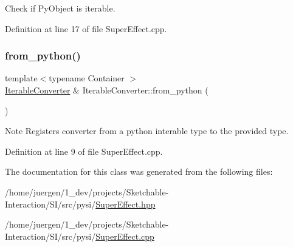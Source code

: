 Check if Py\+Object is iterable. 



Definition at line 17 of file Super\+Effect.\+cpp.

\mbox{\label{class_iterable_converter_a521a8eee4934ed7afa8bce9633a70e36}} 
\subsubsection{\texorpdfstring{from\_python()}{from\_python()}}
{\footnotesize\ttfamily template$<$typename Container $>$ \\
\mbox{\hyperlink{class_iterable_converter}{Iterable\+Converter}} \& Iterable\+Converter\+::from\+\_\+python (\begin{DoxyParamCaption}{ }\end{DoxyParamCaption})}

\begin{DoxyNote}{Note}
Registers converter from a python interable type to the provided type. 
\end{DoxyNote}


Definition at line 9 of file Super\+Effect.\+cpp.



The documentation for this class was generated from the following files\+:\begin{DoxyCompactItemize}
\item 
/home/juergen/1\+\_\+dev/projects/\+Sketchable-\/\+Interaction/\+S\+I/src/pysi/\mbox{\hyperlink{_super_effect_8hpp}{Super\+Effect.\+hpp}}\item 
/home/juergen/1\+\_\+dev/projects/\+Sketchable-\/\+Interaction/\+S\+I/src/pysi/\mbox{\hyperlink{_super_effect_8cpp}{Super\+Effect.\+cpp}}\end{DoxyCompactItemize}
